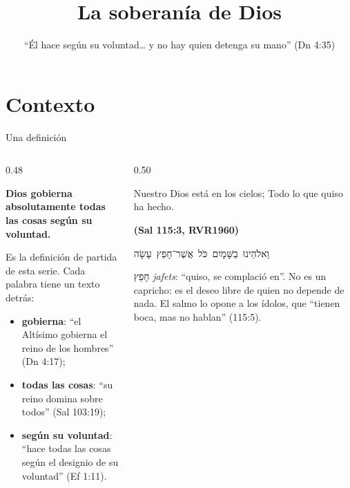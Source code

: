 \documentclass[hyperref={bookmarks=false},aspectratio=169]{beamer}
\title[La soberanía de Dios]{\bfseries{La soberanía de Dios}}
\subtitle{``Él hace según su voluntad\ldots{} y no hay quien detenga su mano'' (Dn 4:35)}
\author{}\institute{}\date{}
\newcommand{\heb}[1]{\mbox{\foreignlanguage{hebrew}{#1}}}
\newcommand{\fuente}[1]{\par\hfill{\upshape\bfseries\footnotesize\textcolor{azul}{#1}}}
\newcommand{\destacar}[1]{\textbf{\textcolor{azul}{#1}}}
\begin{document}
\frame{\titlepage}


\section{Contexto}

\begin{frame}{Una definición}
\begin{columns}[c,onlytextwidth]
\begin{column}{0.48\textwidth}
\begin{tcolorbox}[colback=papiro,colframe=azul,boxrule=1pt,arc=3pt]
\centering\large \destacar{Dios gobierna absolutamente todas las cosas según su voluntad.}
\end{tcolorbox}
\small Es la definición de partida de esta serie. Cada palabra tiene un texto detrás:
\begin{itemize}
\item \destacar{gobierna}: ``el Altísimo gobierna el reino de los hombres'' (Dn 4:17);
\item \destacar{todas las cosas}: ``su reino domina sobre todos'' (Sal 103:19);
\item \destacar{según su voluntad}: ``hace todas las cosas según el designio de su voluntad'' (Ef 1:11).
\end{itemize}
\end{column}
\begin{column}{0.50\textwidth}
\begin{cita}Nuestro Dios está en los cielos; Todo lo que quiso ha hecho.\fuente{(Sal 115:3, RVR1960)}\end{cita}
\begin{center}\heb{וֵאלֹהֵינוּ בַשָּׁמָיִם כֹּל אֲשֶׁר־חָפֵץ עָשָׂה}\end{center}
\scriptsize \heb{חָפֵץ} \emph{jafets}: ``quiso, se complació en''. No es un capricho: es el deseo libre de quien no depende de nada. El salmo lo opone a los ídolos, que ``tienen boca, mas no hablan'' (115:5).
\end{column}
\end{columns}
\end{frame}
\end{document}
